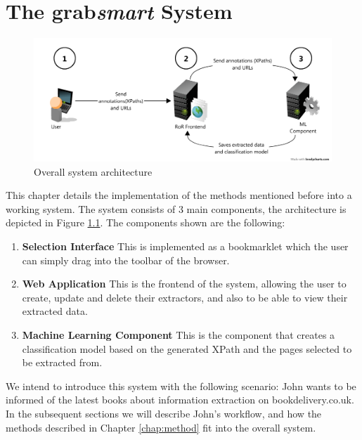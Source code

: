 \chapter{The grab\textit{smart} System}
\label{chap:implementation}

\begin{figure}[htbp]
\centering
\includegraphics[scale=0.43]{implementation.png} 
\caption{Overall system architecture}
\label{fig:systemarchitecture}
\end{figure}


\label{chap:selection}
This chapter details the implementation of the methods mentioned before into a working system.
The system consists of 3 main components, the architecture is depicted in Figure \ref{fig:systemarchitecture}.
The components shown are the following:

\begin{enumerate}
	\item \textbf{Selection Interface}
	This is implemented as a bookmarklet which the user can simply drag into the toolbar of the browser.
	\item \textbf{Web Application}
	This is the frontend of the system, allowing the user to create, update and delete their extractors,
	and also to be able to view their extracted data.
	\item \textbf{Machine Learning Component}
	This is the component that creates a classification model based on the generated XPath and the pages selected to be extracted from.
\end{enumerate}

We intend to introduce this system with the following scenario: John wants to be informed of 
the latest books about information extraction on bookdelivery.co.uk. In the subsequent sections
we will describe John's workflow, and how the methods described in Chapter \ref{chap:method} 
fit into the overall system.

